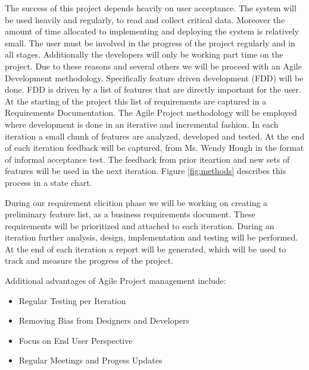 \documentclass{journal}
\begin{document}
The success of this project depends heavily on user acceptance. The system will be used heavily and regularly, to read and collect critical data. Moreover the amount of time allocated to implementing and deploying 
the system is relatively small. The user must be involved in the progress of the project regularly and in all stages. Additionally the developers will only be working part time on the project. Due to these reasons and several others we will be proceed with an Agile Development methodology. Specifically
feature driven development (FDD) will be done. FDD is driven by a list of features that are directly important for the user. At the starting of the project this list of requirements are captured in a Requirements Documentation.
The Agile Project methodology will be employed where development is done in an iterative and incremental fashion. In each iteration a small chunk of features are analyzed, developed and tested. At the end of each iteration feedback will be captured, from Ms. Wendy Hough in the format of informal
acceptance test. The feedback from prior iteartion and new sets of features will be used in the next iteration. Figure \ref{fig:methods} describes this process in a state chart. 

During our requirement elicition phase we will be working on creating a preliminary feature list, as a business requirements document. These requirements will be prioritized and attached to each iteration. During an iteration further analysis, design, implementation and testing will be performed. At the end of each iteration a report will be generated, which will be used to track and measure the progress of the project. 

Additional advantages of Agile Project management include:
\begin{itemize}

\item{Regular Testing per Iteration}
\item{Removing Bias from Designers and Developers}
\item{Focus on End User Perspective}
\item{Regular Meetings and Progess Updates}

\end{itemize}
\end{document}
